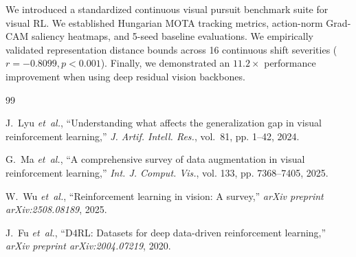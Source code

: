 \documentclass[journal]{IEEEtran}
\begin{document}
We introduced a standardized continuous visual pursuit benchmark suite for visual RL. We established Hungarian MOTA tracking metrics, action-norm Grad-CAM saliency heatmaps, and 5-seed baseline evaluations. We empirically validated representation distance bounds across 16 continuous shift severities ($r = -0.8099, p < 0.001$). Finally, we demonstrated an $11.2\times$ performance improvement when using deep residual vision backbones.

\begin{thebibliography}{99}

J.~Lyu \emph{et~al.}, ``Understanding what affects the generalization gap in visual reinforcement learning,'' \emph{J. Artif. Intell. Res.}, vol.~81, pp. 1--42, 2024.

G.~Ma \emph{et~al.}, ``A comprehensive survey of data augmentation in visual reinforcement learning,'' \emph{Int. J. Comput. Vis.}, vol. 133, pp. 7368--7405, 2025.

W.~Wu \emph{et~al.}, ``Reinforcement learning in vision: A survey,'' \emph{arXiv preprint arXiv:2508.08189}, 2025.

J.~Fu \emph{et~al.}, ``D4RL: Datasets for deep data-driven reinforcement learning,'' \emph{arXiv preprint arXiv:2004.07219}, 2020.

\end{thebibliography}
\end{document}

